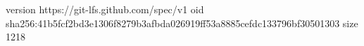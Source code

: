 version https://git-lfs.github.com/spec/v1
oid sha256:41b5fcf2bd3e1306f8279b3afbda026919ff53a8885cefdc133796bf30501303
size 1218
